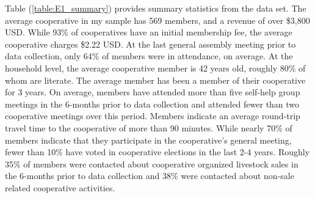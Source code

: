 \documentclass[11pt]{article}
\begin{document}
Table (\ref{table:E1_summary}) provides summary statistics from the data set. The average cooperative in my sample has 569 members, and a revenue of over \$3,800 USD. While 93\% of cooperatives have an initial membership fee, the average cooperative charges \$2.22 USD. At the last general assembly meeting prior to data collection, only 64\% of members were in attendance, on average. At the household level, the average cooperative member is 42 years old, roughly 80\% of whom are literate. The average member has been a member of their cooperative for 3 years. On average, members have attended more than five self-help group meetings in the 6-months prior to data collection and attended fewer than two cooperative meetings over this period. Members indicate an average round-trip travel time to the cooperative of more than 90 minutes. %
While nearly 70\% of members indicate that they participate in the cooperative's general meeting, fewer than 10\% have voted in cooperative elections in the last 2-4 years. Roughly 35\% of members were contacted about cooperative organized livestock sales in the 6-months prior to data collection and 38\% were contacted about non-sale related cooperative activities. 
\end{document}
